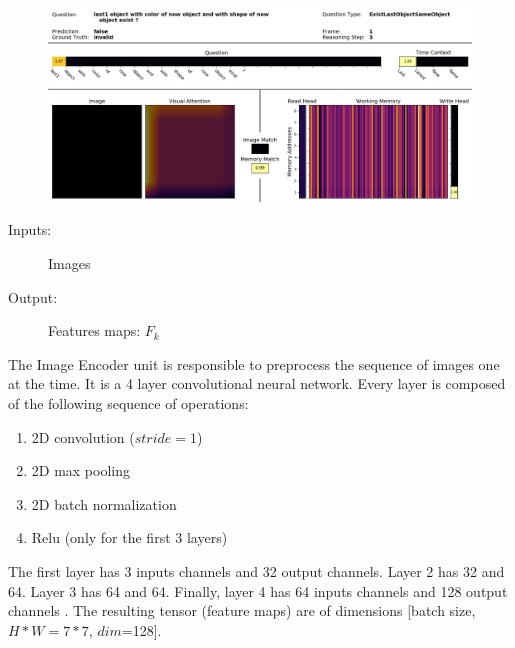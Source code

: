 \begin{figure}
	\includegraphics[width=\textwidth]{img/image}
	\label{fig:model}
\end{figure}	


\begin{description}
	\item[Inputs:] 
	Images
	
	\item[Output:] 
	Features maps:
	$F_k$
\end{description}






The Image Encoder unit is responsible to preprocess the sequence of images one at the time. It is a 4 layer convolutional neural network. Every layer is composed of the following sequence of operations:

\begin{enumerate}
	\item 2D convolution ($stride=1$) 
	\item 2D max pooling
	\item 2D batch normalization
	\item Relu (only for the first 3 layers)
\end{enumerate}

The first layer has 3 inputs channels and 32 output channels. Layer 2 has 32 and 64. Layer 3 has 64 and 64. Finally, layer 4 has 64 inputs channels and 128 output channels .
The resulting tensor (feature maps) are of dimensions [batch size, $H*W =7*7$, $dim$=128]. 






